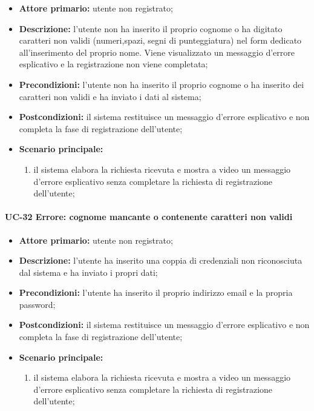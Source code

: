 	\begin{itemize}
		\item \textbf{Attore primario:} utente non registrato;

		\item \textbf{Descrizione:} l'utente non ha inserito il proprio cognome o ha digitato caratteri non validi (numeri,spazi, segni di punteggiatura) nel form dedicato all'inserimento del proprio nome. Viene visualizzato un messaggio d'errore esplicativo e la registrazione non viene completata;

		\item \textbf{Precondizioni:} l'utente non ha inserito il proprio cognome o ha inserito dei caratteri non validi e ha inviato i dati al sistema;

		\item \textbf{Postcondizioni:} il sistema restituisce un messaggio d'errore esplicativo e non completa la fase di registrazione dell'utente;

		\item \textbf{Scenario principale:}
	  		\begin{enumerate}
		  		\item il sistema elabora la richiesta ricevuta e mostra a video un messaggio d'errore esplicativo senza completare la richiesta di registrazione dell'utente; 
	  		\end{enumerate}
	\end{itemize}
 

\paragraph{UC-32 Errore: cognome mancante o contenente caratteri non validi}

	\begin{itemize}
		\item \textbf{Attore primario:} utente non registrato;

		\item \textbf{Descrizione:} l'utente ha inserito una coppia di credenziali non riconosciuta dal sistema e ha inviato i propri dati;

		\item \textbf{Precondizioni:} l'utente ha inserito il proprio indirizzo email e la propria password;

		\item \textbf{Postcondizioni:} il sistema restituisce un messaggio d'errore esplicativo e non completa la fase di registrazione dell'utente;

		\item \textbf{Scenario principale:}
	  		\begin{enumerate}
		  		\item il sistema elabora la richiesta ricevuta e mostra a video un messaggio d'errore esplicativo senza completare la richiesta di registrazione dell'utente; 
	  		\end{enumerate}
	\end{itemize}

